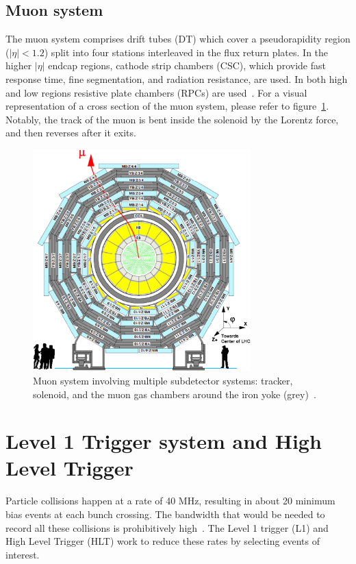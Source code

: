 \subsection{Muon system} 
The muon system comprises drift tubes (DT) which cover a pseudorapidity region ($|\eta|<1.2$) split into four stations interleaved in the flux return plates.
In the higher $|\eta|$ endcap regions, cathode strip chambers (CSC), which provide fast response time, fine segmentation, and radiation resistance, are used. In both high and low regions resistive plate chambers (RPCs) are used~\cite{Chatrchyan:1129810}. For a visual representation of a cross section of the muon system, please refer to figure~\ref{fig:muonsystem}. 
Notably, the track of the muon is bent inside the solenoid by the Lorentz force, and then reverses after it exits. 

\begin{figure}[ht!b]
\label{fig:muonsystem} 
  \centering
\includegraphics[width=0.75\textwidth]{figures/1-s2.0-S0168900208012230-gr1_lrg.jpg}    
    \caption{Muon system involving multiple subdetector systems: tracker, solenoid, and the muon gas chambers around the iron yoke (grey)~\cite{ABBIENDI2009192}.}
\end{figure}


\section{Level 1 Trigger system and High Level Trigger}
\label{sec:l1hlt}
Particle collisions happen at a rate of 40 MHz, resulting in about 20 minimum bias events at each bunch crossing. The bandwidth that would be needed to record all these collisions is prohibitively high~\cite{Bruning:782076,Foudas:2232067}. The Level 1 trigger (L1) and High Level Trigger (HLT) work to reduce these rates by selecting events of interest. 

